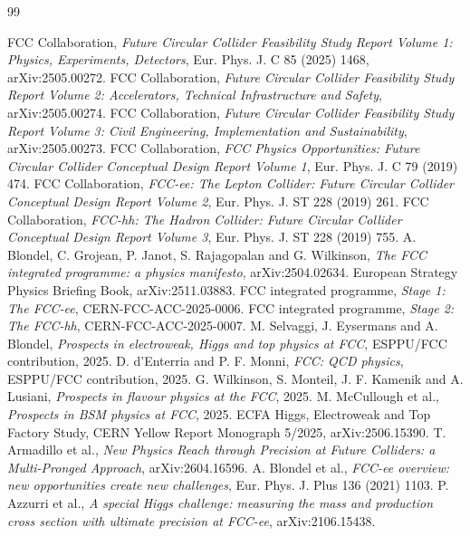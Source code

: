 \documentclass[11pt,a4paper]{article}
\numberwithin{equation}{section}
\begin{document}
\newpage
\begin{thebibliography}{99}
 FCC Collaboration, \emph{Future Circular Collider Feasibility Study Report Volume 1: Physics, Experiments, Detectors}, Eur. Phys. J. C 85 (2025) 1468, arXiv:2505.00272.
 FCC Collaboration, \emph{Future Circular Collider Feasibility Study Report Volume 2: Accelerators, Technical Infrastructure and Safety}, arXiv:2505.00274.
 FCC Collaboration, \emph{Future Circular Collider Feasibility Study Report Volume 3: Civil Engineering, Implementation and Sustainability}, arXiv:2505.00273.
 FCC Collaboration, \emph{FCC Physics Opportunities: Future Circular Collider Conceptual Design Report Volume 1}, Eur. Phys. J. C 79 (2019) 474.
 FCC Collaboration, \emph{FCC-ee: The Lepton Collider: Future Circular Collider Conceptual Design Report Volume 2}, Eur. Phys. J. ST 228 (2019) 261.
 FCC Collaboration, \emph{FCC-hh: The Hadron Collider: Future Circular Collider Conceptual Design Report Volume 3}, Eur. Phys. J. ST 228 (2019) 755.
 A. Blondel, C. Grojean, P. Janot, S. Rajagopalan and G. Wilkinson, \emph{The FCC integrated programme: a physics manifesto}, arXiv:2504.02634.
 European Strategy Physics Briefing Book, arXiv:2511.03883.
 FCC integrated programme, \emph{Stage 1: The FCC-ee}, CERN-FCC-ACC-2025-0006.
 FCC integrated programme, \emph{Stage 2: The FCC-hh}, CERN-FCC-ACC-2025-0007.
 M. Selvaggi, J. Eysermans and A. Blondel, \emph{Prospects in electroweak, Higgs and top physics at FCC}, ESPPU/FCC contribution, 2025.
 D. d'Enterria and P. F. Monni, \emph{FCC: QCD physics}, ESPPU/FCC contribution, 2025.
 G. Wilkinson, S. Monteil, J. F. Kamenik and A. Lusiani, \emph{Prospects in flavour physics at the FCC}, 2025.
 M. McCullough et al., \emph{Prospects in BSM physics at FCC}, 2025.
 ECFA Higgs, Electroweak and Top Factory Study, CERN Yellow Report Monograph 5/2025, arXiv:2506.15390.
 T. Armadillo et al., \emph{New Physics Reach through Precision at Future Colliders: a Multi-Pronged Approach}, arXiv:2604.16596.
 A. Blondel et al., \emph{FCC-ee overview: new opportunities create new challenges}, Eur. Phys. J. Plus 136 (2021) 1103.
 P. Azzurri et al., \emph{A special Higgs challenge: measuring the mass and production cross section with ultimate precision at FCC-ee}, arXiv:2106.15438.

\end{thebibliography}
\end{document}
